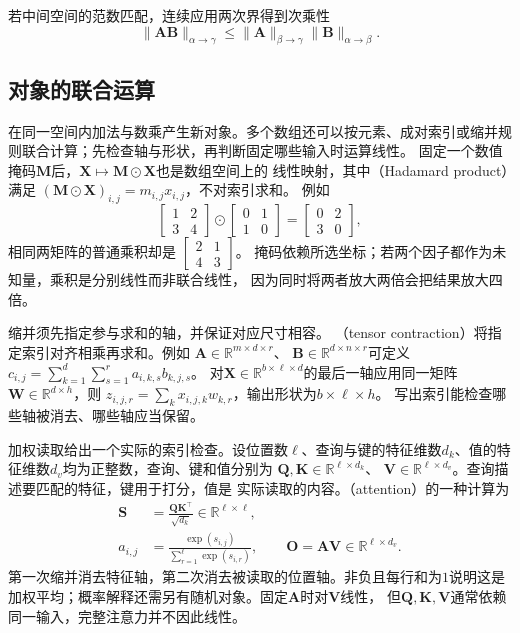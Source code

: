 若中间空间的范数匹配，连续应用两次界得到次乘性
\[
 \lVert\bm A\bm B\rVert_{\alpha\to\gamma}
 \leq\lVert\bm A\rVert_{\beta\to\gamma}
       \lVert\bm B\rVert_{\alpha\to\beta}.
\]


\subsection{对象的联合运算}
\label{sec:linear-algebra-joint-operations}

在同一空间内加法与数乘产生新对象。多个数组还可以按元素、成对索引或缩并规则联合计算；先检查轴与形状，再判断固定哪些输入时运算线性。
固定一个数值掩码$\bm M$后，$\bm X\mapsto\bm M\odot\bm X$也是数组空间上的
线性映射，其中（Hadamard product）满足
$(\bm M\odot\bm X)_{i,j}=m_{i,j}x_{i,j}$，不对索引求和。
例如
\[
 \begin{bmatrix}1&2\\3&4\end{bmatrix}
 \odot\begin{bmatrix}0&1\\1&0\end{bmatrix}
 =\begin{bmatrix}0&2\\3&0\end{bmatrix},
\]
相同两矩阵的普通乘积却是
$\left[\begin{smallmatrix}2&1\\4&3\end{smallmatrix}\right]$。
掩码依赖所选坐标；若两个因子都作为未知量，乘积是分别线性而非联合线性，
因为同时将两者放大两倍会把结果放大四倍。


缩并须先指定参与求和的轴，并保证对应尺寸相容。
（tensor contraction）将指定索引对齐相乘再求和。例如
$\bm A\in\mathbb R^{m\times d\times r}$、
$\bm B\in\mathbb R^{d\times n\times r}$可定义
$c_{i,j}=\sum_{k=1}^d\sum_{s=1}^r a_{i,k,s}b_{k,j,s}$。
对$\bm X\in\mathbb R^{b\times\ell\times d}$的最后一轴应用同一矩阵
$\bm W\in\mathbb R^{d\times h}$，则
$z_{i,j,r}=\sum_k x_{i,j,k}w_{k,r}$，输出形状为$b\times\ell\times h$。
写出索引能检查哪些轴被消去、哪些轴应当保留。


加权读取给出一个实际的索引检查。设位置数$\ell$、查询与键的特征维数$d_k$、值的特征维数$d_v$均为正整数，查询、键和值分别为
$\bm Q,\bm K\in\mathbb R^{\ell\times d_k}$、
$\bm V\in\mathbb R^{\ell\times d_v}$。查询描述要匹配的特征，键用于打分，值是
实际读取的内容。（attention）的一种计算为
\begin{align}
 \bm S&=\frac{\bm Q\bm K^\top}{\sqrt{d_k}}\in\mathbb R^{\ell\times\ell},
 \label{eq:linear-algebra-attention-scores}\\
 a_{i,j}&=\frac{\exp(s_{i,j})}{\sum_{r=1}^{\ell}\exp(s_{i,r})},
 \qquad\bm O=\bm A\bm V\in\mathbb R^{\ell\times d_v}.
 \label{eq:linear-algebra-attention-contraction}
\end{align}
第一次缩并消去特征轴，第二次消去被读取的位置轴。非负且每行和为$1$说明这是
加权平均；概率解释还需另有随机对象。固定$\bm A$时对$\bm V$线性，
但$\bm Q,\bm K,\bm V$通常依赖同一输入，完整注意力并不因此线性。

